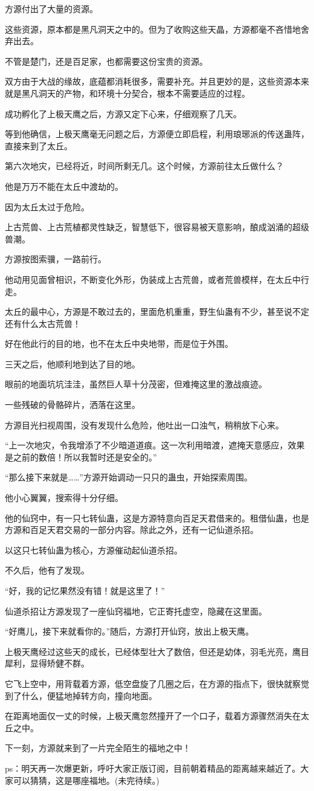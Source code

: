 \begin{this_body}
方源付出了大量的资源。

这些资源，原本都是黑凡洞天之中的。但为了收购这些天晶，方源都毫不吝惜地舍弃出去。

不管是楚门，还是百足家，也都需要这份宝贵的资源。

双方由于大战的缘故，底蕴都消耗很多，需要补充。并且更妙的是，这些资源本来就是黑凡洞天的产物，和环境十分契合，根本不需要适应的过程。

成功孵化了上极天鹰之后，方源又定下心来，仔细观察了几天。

等到他确信，上极天鹰毫无问题之后，方源便立即启程，利用琅琊派的传送蛊阵，直接来到了太丘。

第六次地灾，已经将近，时间所剩无几。这个时候，方源前往太丘做什么？

他是万万不能在太丘中渡劫的。

因为太丘太过于危险。

上古荒兽、上古荒植都灵性缺乏，智慧低下，很容易被天意影响，酿成汹涌的超级兽潮。

方源按图索骥，一路前行。

他动用见面曾相识，不断变化外形，伪装成上古荒兽，或者荒兽模样，在太丘中行走。

太丘的最中心，方源是不敢过去的，里面危机重重，野生仙蛊有不少，甚至说不定还有什么太古荒兽！

好在他此行的目的地，也不在太丘中央地带，而是位于外围。

三天之后，他顺利地到达了目的地。

眼前的地面坑坑洼洼，虽然巨人草十分茂密，但难掩这里的激战痕迹。

一些残破的骨骼碎片，洒落在这里。

方源目光扫视周围，没有发现什么危险，他吐出一口浊气，稍稍放下心来。

“上一次地灾，令我增添了不少暗道道痕。这一次利用暗渡，遮掩天意感应，效果是之前的数倍！所以我暂时还是安全的。”

“那么接下来就是……”方源开始调动一只只的蛊虫，开始探索周围。

他小心翼翼，搜索得十分仔细。

他的仙窍中，有一只七转仙蛊，这是方源特意向百足天君借来的。租借仙蛊，也是方源和百足天君交易的一部分内容。除此之外，还有一记仙道杀招。

以这只七转仙蛊为核心，方源催动起仙道杀招。

不久后，他有了发现。

“好，我的记忆果然没有错！就是这里了！”

仙道杀招让方源发现了一座仙窍福地，它正寄托虚空，隐藏在这里面。

“好鹰儿，接下来就看你的。”随后，方源打开仙窍，放出上极天鹰。

上极天鹰经过这些天的成长，已经体型壮大了数倍，但还是幼体，羽毛光亮，鹰目犀利，显得矫健不群。

它飞上空中，用背载着方源，低空盘旋了几圈之后，在方源的指点下，很快就察觉到了什么，便猛地掉转方向，撞向地面。

在距离地面仅一丈的时候，上极天鹰忽然撞开了一个口子，载着方源骤然消失在太丘之中。

下一刻，方源就来到了一片完全陌生的福地之中！

ps：明天再一次爆更新，呼吁大家正版订阅，目前朝着精品的距离越来越近了。大家可以猜猜，这是哪座福地。(未完待续。)

\end{this_body}

